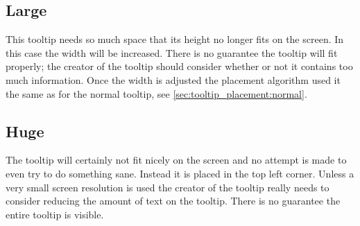 \subsection{Large}
\label{sec:tooltip_placement:large}

This tooltip needs so much space that its height no longer fits on the
screen. In this case the width will be increased. There is no guarantee the
tooltip will fit properly; the creator of the tooltip should consider
whether or not it contains too much information. Once the width is adjusted the
placement algorithm used it the same as for the normal tooltip, see
\cref{sec:tooltip_placement:normal}.


\subsection{Huge}
\label{sec:tooltip_placement:huge}

The tooltip will certainly not fit nicely on the screen and no attempt is
made to even try to do something sane. Instead it is placed in the top left
corner. Unless a very small screen resolution is used the creator of the
tooltip really needs to consider reducing the amount of text on the tooltip.
There is no guarantee the entire tooltip is visible.
